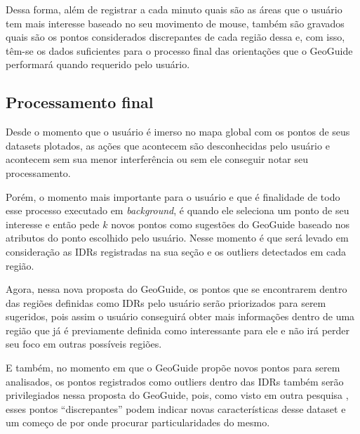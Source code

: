 Dessa forma, além de registrar a cada minuto quais são as áreas que o usuário tem mais interesse baseado no seu movimento de mouse, também são gravados quais são os pontos considerados discrepantes de cada região dessa e, com isso, têm-se os dados suficientes para o processo final das orientações que o GeoGuide performará quando requerido pelo usuário.

\subsection{Processamento final}

Desde o momento que o usuário é imerso no mapa global com os pontos de seus datasets plotados, as ações que acontecem são desconhecidas pelo usuário e acontecem sem sua menor interferência ou sem ele conseguir notar seu processamento.

Porém, o momento mais importante para o usuário e que é finalidade de todo esse processo executado em \textit{background}, é quando ele seleciona um ponto de seu interesse e então pede $k$ novos pontos como sugestões do GeoGuide baseado nos atributos do ponto escolhido pelo usuário. Nesse momento é que será levado em consideração as IDRs registradas na sua seção e os outliers detectados em cada região.

Agora, nessa nova proposta do GeoGuide, os pontos que se encontrarem dentro das regiões definidas como IDRs pelo usuário serão priorizados para serem sugeridos, pois assim o usuário conseguirá obter mais informações dentro de uma região que já é previamente definida como interessante para ele e não irá perder seu foco em outras possíveis regiões.

E também, no momento em que o GeoGuide propõe novos pontos para serem analisados, os pontos registrados como outliers dentro das IDRs também serão privilegiados nessa proposta do GeoGuide, pois, como visto em outra pesquisa \cite{DBLP:journals/debu/FreireCVZ16}, esses pontos ``discrepantes'' podem indicar novas características desse dataset e um começo de por onde procurar particularidades do mesmo.
